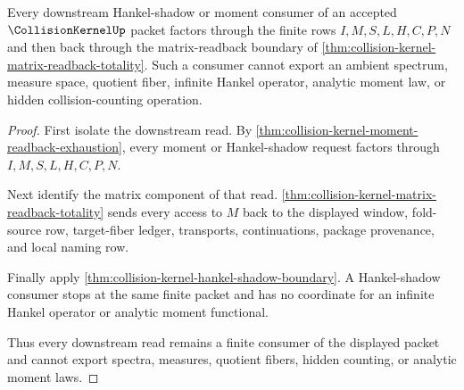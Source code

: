 \begin{theorem}
\label{thm:collision-kernel-downstream-non-escape-package}
Every downstream Hankel-shadow or moment consumer of an accepted $\CollisionKernelUp$ packet factors through the finite rows $I,M,S,L,H,C,P,N$ and then back through the matrix-readback boundary of \autoref{thm:collision-kernel-matrix-readback-totality}. Such a consumer cannot export an ambient spectrum, measure space, quotient fiber, infinite Hankel operator, analytic moment law, or hidden collision-counting operation.
\end{theorem}
\begin{proof}
First isolate the downstream read. By \autoref{thm:collision-kernel-moment-readback-exhaustion}, every moment or Hankel-shadow request factors through $I,M,S,L,H,C,P,N$.

Next identify the matrix component of that read. \autoref{thm:collision-kernel-matrix-readback-totality} sends every access to $M$ back to the displayed window, fold-source row, target-fiber ledger, transports, continuations, package provenance, and local naming row.

Finally apply \autoref{thm:collision-kernel-hankel-shadow-boundary}. A Hankel-shadow consumer stops at the same finite packet and has no coordinate for an infinite Hankel operator or analytic moment functional.

Thus every downstream read remains a finite consumer of the displayed packet and cannot export spectra, measures, quotient fibers, hidden counting, or analytic moment laws.
\end{proof}

